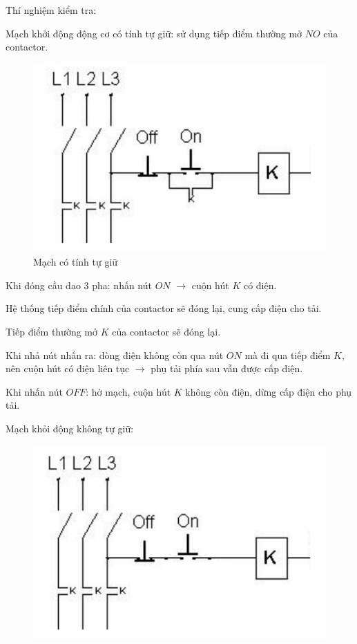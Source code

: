 \documentclass[13pt,a4paper]{extarticle}
\begin{document}
Thí nghiệm kiểm tra:
\begin{list}{--}{}
\item Mạch khởi động động cơ có tính tự giữ: sử dụng tiếp điểm thường mở $NO$ của contactor.
\begin{figure}[!h]
\begin{center}
\includegraphics[scale=.55]{contactor-1}
\end{center}
\caption{Mạch có tính tự giữ}
\end{figure}
\begin{list}{+}{}
\item Khi đóng cầu dao 3 pha: nhấn nút $ON$ $\rightarrow$ cuộn hút $K$ có điện.
\item Hệ thống tiếp điểm chính của contactor sẽ đóng lại, cung cấp điện cho tải.
\item Tiếp điểm thường mở $K$ của contactor sẽ đóng lại.
\item Khi nhả nút nhấn ra: dòng điện không còn qua nút $ON$ mà đi qua tiếp điểm $K$, nên cuộn hút có điện liên tục $\rightarrow$ phụ tải phía sau vẫn được cấp điện.
\item Khi nhấn nút $OFF$: hở mạch, cuộn hút $K$ không còn điện, dừng cấp điện cho phụ tải.
\end{list}
\item Mạch khỏi động không tự giữ:
\begin{figure}[!h]
\begin{center}
\includegraphics[scale=.55]{contactor-2}

\end{center}
\end{figure}
\end{list}
\end{document}
